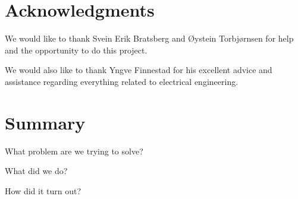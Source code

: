 \clearpage
\section{Acknowledgments}
We would like to thank Svein Erik Bratsberg and \O ystein Torbj\o rnsen for help and the opportunity to do this project.

We would also like to thank Yngve Finnestad for his excellent advice and assistance regarding everything related to electrical engineering.

\section{Summary}
What problem are we trying to solve?

What did we do?

How did it turn out?


